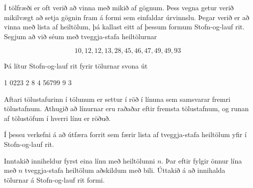 
Í tölfræði er oft verið að vinna með mikið af gögnum. Þess vegna getur verið
mikilvægt að setja gögnin fram á formi sem einfaldar úrvinnslu. Þegar verið er
að vinna með lista af heiltölum, þá kallast eitt af þessum formum Stofn-og-lauf
rit. Segjum að við séum með tveggja-stafa heiltölurnar

$$10, 12, 12, 13, 28, 45, 46, 47, 49, 49, 93$$

Þá lítur Stofn-og-lauf rit fyrir tölurnar svona út

    1 0223
    2 8
    4 56799
    9 3

Aftari tölustafurinn í tölunum er settur í röð í línuna sem samsvarar fremri
tölustafnum. Athugið að línurnar eru raðaðar eftir fremsta tölustafnum, og
runan af tölustöfum í hverri línu er röðuð.

Í þessu verkefni á að útfæra forrit sem færir lista af tveggja-stafa heiltölum
yfir í Stofn-og-lauf rit.

Inntakið inniheldur fyrst eina línu með heiltölunni $n$. Þar eftir fylgir önnur
lína með $n$ tveggja-stafa heiltölum aðskildum með bili. Úttakið á að innihalda
tölurnar á Stofn-og-lauf rit formi.

